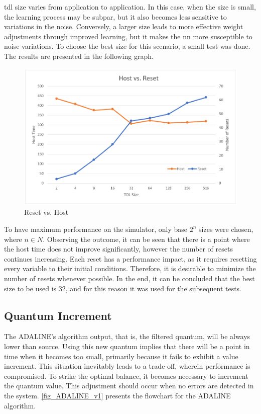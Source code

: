 \gls{tdl} size varies from application to application. In this case, when the size is small, the learning process may be subpar, but it also becomes less sensitive to variations in the noise. Conversely, a larger size leads to more effective weight adjustments through improved learning, but it makes the \gls{nn} more susceptible to noise variations. To choose the best size for this scenario, a small test was done. The results are presented in the following graph.

\begin{figure}[H]
	\centering
 	\includegraphics[width=0.7\linewidth]{Images/ResetVsHost.png}
 	\caption{Reset vs. Host}
	 \label{fig_ResetVsHost}
\end{figure}

To have maximum performance on the simulator, only base $2^{n}$ sizes were chosen, where $n \in N$. Observing the outcome, it can be seen that there is a point where the host time does not improve significantly, however the number of resets continues increasing. Each reset has a performance impact, as it requires resetting every variable to their initial conditions. Therefore, it is desirable to minimize the number of resets whenever possible. In the end, it can be concluded that the best size to be used is 32, and for this reason it was used for the subsequent tests.

\subsection{Quantum Increment}

The ADALINE's algorithm output, that is, the filtered quantum, will be always lower than source. Using this new quantum implies that there will be a point in time when it becomes too small, primarily because it fails to exhibit a value increment. This situation inevitably leads to a trade-off, wherein performance is compromised. To strike the optimal balance, it becomes necessary to increment the quantum value. This adjustment should occur when no errors are detected in the system. \autoref{fig_ADALINE_v1} presents the flowchart for the ADALINE algorithm.

